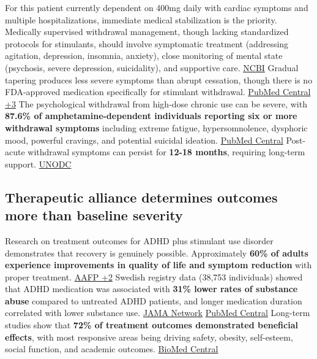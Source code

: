 For this patient currently dependent on 400mg daily with cardiac symptoms and multiple hospitalizations, immediate medical stabilization is the priority. Medically supervised withdrawal management, though lacking standardized protocols for stimulants, should involve symptomatic treatment (addressing agitation, depression, insomnia, anxiety), close monitoring of mental state (psychosis, severe depression, suicidality), and supportive care. \href{https://www.ncbi.nlm.nih.gov/books/NBK310652/}{NCBI} Gradual tapering produces less severe symptoms than abrupt cessation, though there is no FDA-approved medication specifically for stimulant withdrawal. \href{https://pmc.ncbi.nlm.nih.gov/articles/PMC7138250/}{PubMed Central +3} The psychological withdrawal from high-dose chronic use can be severe, with \textbf{87.6\% of amphetamine-dependent individuals reporting six or more withdrawal symptoms} including extreme fatigue, hypersomnolence, dysphoric mood, powerful cravings, and potential suicidal ideation. \href{https://pmc.ncbi.nlm.nih.gov/articles/PMC3227772/}{PubMed Central} Post-acute withdrawal symptoms can persist for \textbf{12-18 months}, requiring long-term support. \href{https://www.unodc.org/documents/drug-prevention-and-treatment/Treatment_of_PSUD_for_website_24.05.19.pdf}{UNODC}

\subsection{Therapeutic alliance determines outcomes more than baseline severity}\label{10c_self_medication-therapeutic-alliance-determines-outcomes-more-than-baseline-severity}

Research on treatment outcomes for ADHD plus stimulant use disorder demonstrates that recovery is genuinely possible. Approximately \textbf{60\% of adults experience improvements in quality of life and symptom reduction} with proper treatment. \href{https://www.aafp.org/family-physician/patient-care/prevention-wellness/emotional-wellbeing/adhd-toolkit/treatment-and-management.html}{AAFP +2} Swedish registry data (38,753 individuals) showed that ADHD medication was associated with \textbf{31\% lower rates of substance abuse} compared to untreated ADHD patients, and longer medication duration correlated with lower substance use. \href{https://jamanetwork.com/journals/jamapsychiatry/fullarticle/2806881}{JAMA Network} \href{https://pmc.ncbi.nlm.nih.gov/articles/PMC4147667/}{PubMed Central} Long-term studies show that \textbf{72\% of treatment outcomes demonstrated beneficial effects}, with most responsive areas being driving safety, obesity, self-esteem, social function, and academic outcomes. \href{https://bmcmedicine.biomedcentral.com/articles/10.1186/1741-7015-10-99}{BioMed Central}

